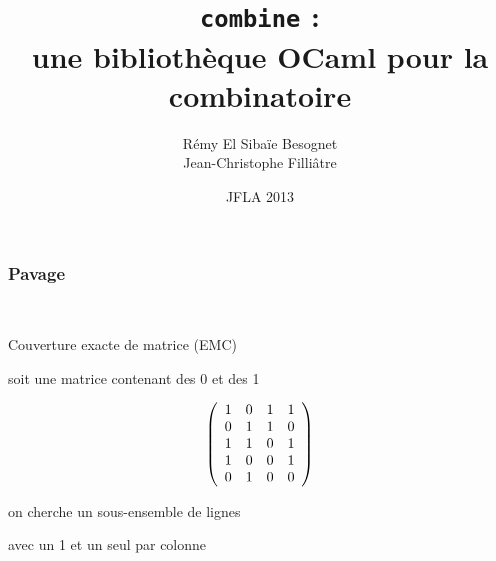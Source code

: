 \documentclass{beamer}
\begin{document}
\author{Rémy El Sibaïe Besognet \\
Jean-Christophe Filliâtre}
\title{\texttt{combine} : \\ une bibliothèque OCaml pour la combinatoire}
\date{JFLA 2013}

\begin{frame}
  \titlepage
\end{frame}

\begin{frame}\frametitle{Pavage}
  \begin{center}
  \\[2em]
  \end{center}
\end{frame}

\begin{frame}{Couverture exacte de matrice (EMC)}

  soit une matrice contenant des 0 et des 1

  \bigskip

  \begin{displaymath}
   \left(\begin{array}{ c c c c c }
   1 & 0 & 1 & 1 \\
   0 & 1 & 1 & 0 \\
   1 & 1 & 0 & 1 \\
   1 & 0 & 0 & 1 \\
   0 & 1 & 0 & 0
  \end{array}\right)
  \end{displaymath}

  \bigskip

  on cherche un sous-ensemble de lignes \par
  avec un 1 et un seul par colonne

\end{frame}


\end{document}
